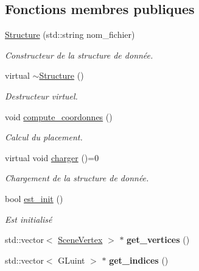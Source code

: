 \subsection*{Fonctions membres publiques}
\begin{DoxyCompactItemize}
\item 
\hyperlink{classStructure_a9d637ea8f6fea642dedfdcdde5947751}{Structure} (std\+::string nom\+\_\+fichier)
\begin{DoxyCompactList}\small\item\em Constructeur de la structure de donnée. \end{DoxyCompactList}\item 
\hypertarget{classStructure_a2d27a247175436df0976f24a83a47b5e}{virtual \hyperlink{classStructure_a2d27a247175436df0976f24a83a47b5e}{$\sim$\+Structure} ()}\label{classStructure_a2d27a247175436df0976f24a83a47b5e}

\begin{DoxyCompactList}\small\item\em Destructeur virtuel. \end{DoxyCompactList}\item 
void \hyperlink{classStructure_a9f9c7f0adff513ccef085b40cee7f6e6}{compute\+\_\+coordonnes} ()
\begin{DoxyCompactList}\small\item\em Calcul du placement. \end{DoxyCompactList}\item 
virtual void \hyperlink{classStructure_ae99db977c0b38122644cf458ea3d5974}{charger} ()=0
\begin{DoxyCompactList}\small\item\em Chargement de la structure de donnée. \end{DoxyCompactList}\item 
bool \hyperlink{classStructure_aa359fa1eec0c2983f10ec94bb14d600b}{est\+\_\+init} ()
\begin{DoxyCompactList}\small\item\em Est initialisé \end{DoxyCompactList}\item 
\hypertarget{classStructure_ad5f67febcbc56fea6c21eb49d43fe028}{std\+::vector$<$ \hyperlink{structSceneVertex}{Scene\+Vertex} $>$ $\ast$ {\bfseries get\+\_\+vertices} ()}\label{classStructure_ad5f67febcbc56fea6c21eb49d43fe028}

\item 
\hypertarget{classStructure_a4157095e5f5cbb1826c5884aac8bba8c}{std\+::vector$<$ G\+Luint $>$ $\ast$ {\bfseries get\+\_\+indices} ()}\label{classStructure_a4157095e5f5cbb1826c5884aac8bba8c}

\end{DoxyCompactItemize}
